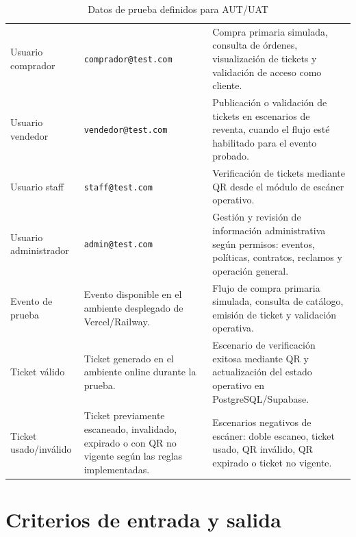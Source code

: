 \documentclass[12pt,letterpaper]{article}
\begin{document}
\begin{table}[H]
\centering
\begingroup
\footnotesize
\setlength{\tabcolsep}{3pt}
\renewcommand{\arraystretch}{1.25}

\begin{tabularx}{\textwidth}{|
>{\raggedright\arraybackslash}p{3.3cm}|
>{\raggedright\arraybackslash}p{4.4cm}|
>{\raggedright\arraybackslash}X|}
\hline
\multicolumn{1}{|>{\centering\arraybackslash}m{3.3cm}|}{\textbf{Dato}} &
\multicolumn{1}{>{\centering\arraybackslash}m{4.4cm}|}{\textbf{Valor o ejemplo}} &
\multicolumn{1}{>{\centering\arraybackslash}m{6.5cm}|}{\textbf{Uso}} \\
\hline
Usuario comprador & \texttt{comprador@test.com} & Compra primaria simulada, consulta de órdenes, visualización de tickets y validación de acceso como cliente. \\
\hline
Usuario vendedor & \texttt{vendedor@test.com} & Publicación o validación de tickets en escenarios de reventa, cuando el flujo esté habilitado para el evento probado. \\
\hline
Usuario staff & \texttt{staff@test.com} & Verificación de tickets mediante QR desde el módulo de escáner operativo. \\
\hline
Usuario administrador & \texttt{admin@test.com} & Gestión y revisión de información administrativa según permisos: eventos, políticas, contratos, reclamos y operación general. \\
\hline
Evento de prueba & Evento disponible en el ambiente desplegado de Vercel/Railway. & Flujo de compra primaria simulada, consulta de catálogo, emisión de ticket y validación operativa. \\
\hline
Ticket válido & Ticket generado en el ambiente online durante la prueba. & Escenario de verificación exitosa mediante QR y actualización del estado operativo en PostgreSQL/Supabase. \\
\hline
Ticket usado/inválido & Ticket previamente escaneado, invalidado, expirado o con QR no vigente según las reglas implementadas. & Escenarios negativos de escáner: doble escaneo, ticket usado, QR inválido, QR expirado o ticket no vigente. \\
\hline
\end{tabularx}

\endgroup
\caption{Datos de prueba definidos para AUT/UAT}
\label{tab:datos-prueba-uat}
\end{table}

\section{Criterios de entrada y salida}
\end{document}
